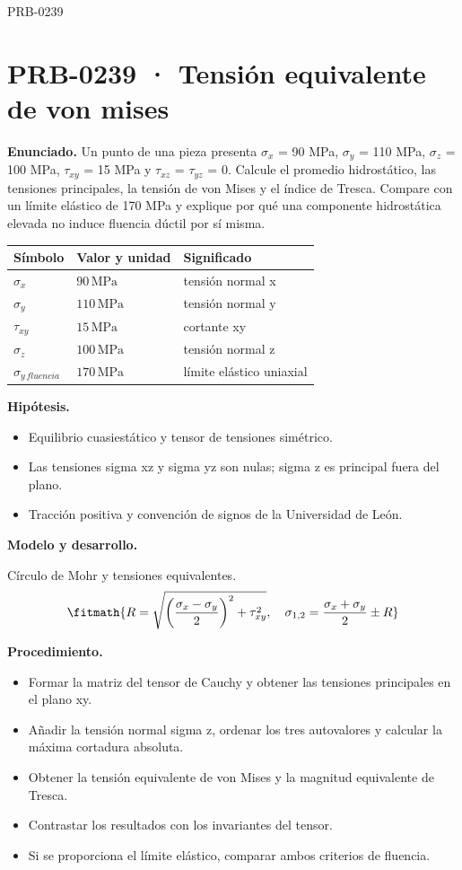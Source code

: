 \begin{studiumworked}{PRB-0239}

\section{PRB-0239 · Tensión equivalente de von mises}

\textbf{Enunciado.} Un punto de una pieza presenta $\sigma_x$ = 90 MPa, $\sigma_y$ = 110 MPa, $\sigma_z$ = 100 MPa, $\tau_{xy}$ = 15 MPa y $\tau_{xz}$ = $\tau_{yz}$ = 0. Calcule el promedio hidrostático, las tensiones principales, la tensión de von Mises y el índice de Tresca. Compare con un límite elástico de 170 MPa y explique por qué una componente hidrostática elevada no induce fluencia dúctil por sí misma.

\par\medskip\noindent\begin{tabular}{@{}p{.18\linewidth}p{.26\linewidth}p{.48\linewidth}@{}}
\toprule Símbolo & Valor y unidad & Significado\\\midrule
$\sigma_{x}$ & $90\,\mathrm{MPa}$ & tensión normal x\\
$\sigma_{y}$ & $110\,\mathrm{MPa}$ & tensión normal y\\
$\tau_{xy}$ & $15\,\mathrm{MPa}$ & cortante xy\\
$\sigma_{z}$ & $100\,\mathrm{MPa}$ & tensión normal z\\
$\sigma_{y\,fluencia}$ & $170\,\mathrm{MPa}$ & límite elástico uniaxial\\
\bottomrule\end{tabular}\par\medskip

\textbf{Hipótesis.}\begin{itemize}\item Equilibrio cuasiestático y tensor de tensiones simétrico.
\item Las tensiones sigma xz y sigma yz son nulas; sigma z es principal fuera del plano.
\item Tracción positiva y convención de signos de la Universidad de León.\end{itemize}

\textbf{Modelo y desarrollo.}

Círculo de Mohr y tensiones equivalentes.\[\fitmath{R=\sqrt{\left(\frac{\sigma_x-\sigma_y}{2}\right)^2+\tau_{xy}^{2}},\quad\sigma_{1,2}=\frac{\sigma_x+\sigma_y}{2}\pm R}\]

\textbf{Procedimiento.}\begin{itemize}\item Formar la matriz del tensor de Cauchy y obtener las tensiones principales en el plano xy.
\item Añadir la tensión normal sigma z, ordenar los tres autovalores y calcular la máxima cortadura absoluta.
\item Obtener la tensión equivalente de von Mises y la magnitud equivalente de Tresca.
\item Contrastar los resultados con los invariantes del tensor.
\item Si se proporciona el límite elástico, comparar ambos criterios de fluencia.\end{itemize}


\end{studiumworked}
